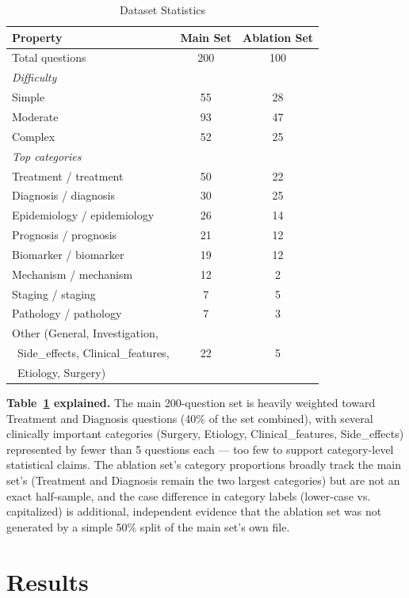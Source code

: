 \documentclass[conference]{IEEEtran}
\begin{document}
\begin{table}[t]
\centering
\caption{Dataset Statistics}
\label{tab:dataset}
\begin{tabular}{@{}lcc@{}}
\toprule
\textbf{Property} & \textbf{Main Set} & \textbf{Ablation Set} \\
\midrule
Total questions & 200 & 100 \\
\midrule
\multicolumn{3}{l}{\textit{Difficulty}} \\
\quad Simple & 55 & 28 \\
\quad Moderate & 93 & 47 \\
\quad Complex & 52 & 25 \\
\midrule
\multicolumn{3}{l}{\textit{Top categories}} \\
\quad Treatment / treatment & 50 & 22 \\
\quad Diagnosis / diagnosis & 30 & 25 \\
\quad Epidemiology / epidemiology & 26 & 14 \\
\quad Prognosis / prognosis & 21 & 12 \\
\quad Biomarker / biomarker & 19 & 12 \\
\quad Mechanism / mechanism & 12 & 2 \\
\quad Staging / staging & 7 & 5 \\
\quad Pathology / pathology & 7 & 3 \\
\quad Other (General, Investigation, & & \\
\quad \ Side\_effects, Clinical\_features, & 22 & 5 \\
\quad \ Etiology, Surgery) & & \\
\bottomrule
\end{tabular}
\end{table}

\textbf{Table~\ref{tab:dataset} explained.} The main 200-question set is heavily weighted toward Treatment and Diagnosis questions (40\% of the set combined), with several clinically important categories (Surgery, Etiology, Clinical\_features, Side\_effects) represented by fewer than 5 questions each --- too few to support category-level statistical claims. The ablation set's category proportions broadly track the main set's (Treatment and Diagnosis remain the two largest categories) but are not an exact half-sample, and the case difference in category labels (lower-case vs. capitalized) is additional, independent evidence that the ablation set was not generated by a simple 50\% split of the main set's own file.

\section{Results}
\end{document}
